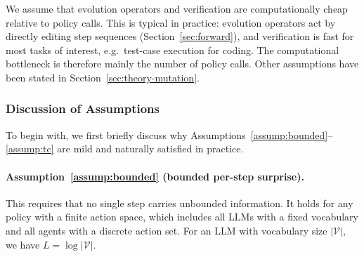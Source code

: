 \documentclass{llmxive}
\begin{document}


We assume that evolution operators and verification are computationally cheap relative to policy calls. This is typical in practice: evolution operators act by directly editing step sequences (Section~\ref{sec:forward}), and verification is fast for most tasks of interest, e.g.\ test-case execution for coding. The computational bottleneck is therefore mainly the number of policy calls. Other assumptions have been stated in Section~\ref{sec:theory-mutation}.

\subsubsection{Discussion of Assumptions}
\label{app:assumptions}

To begin with, we first briefly discuss why Assumptions~\ref{assump:bounded}--\ref{assump:tc} are mild and naturally satisfied in practice.

\paragraph{Assumption~\ref{assump:bounded} (bounded per-step surprise).} This requires that no single step carries unbounded information. It holds for any policy with a finite action space, which includes all LLMs with a fixed vocabulary and all agents with a discrete action set. For an LLM with vocabulary size $|\mathcal{V}|$, we have $L = \log |\mathcal{V}|$.
\end{document}
